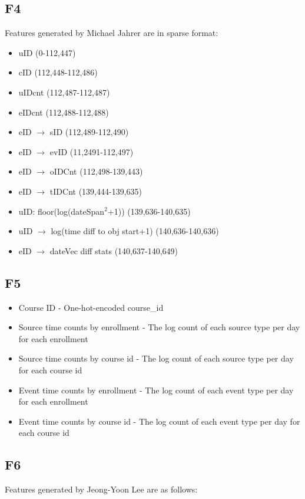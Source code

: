 \subsection{F4}
Features generated by Michael Jahrer are in sparse format:

\begin{itemize}
  \setlength\itemsep{0em}
  \item uID (0-112,447)
  \item cID (112,448-112,486)
  \item uIDcnt (112,487-112,487)
  \item eIDcnt (112,488-112,488)
  \item eID $\rightarrow$ sID (112,489-112,490)
  \item eID $\rightarrow$ evID (11,2491-112,497)
  \item eID $\rightarrow$ oIDCnt (112,498-139,443)
  \item eID $\rightarrow$ tIDCnt (139,444-139,635)
  \item uID: floor(log(dateSpan$^2$+1)) (139,636-140,635)
  \item uID $\rightarrow$ log(time diff to obj start+1) (140,636-140,636)
  \item eID $\rightarrow$ dateVec diff stats (140,637-140,649)
\end{itemize}

\subsection{F5}
\begin{itemize}
  \setlength\itemsep{0em}
  \item Course ID - One-hot-encoded course\_id
  \item Source time counts  by enrollment - The log count of each source type per day for each enrollment
  \item Source time counts by course id - The log count of each source type per day for each course id
  \item Event time counts by enrollment - The log count of each event type per day for each enrollment
  \item Event time counts by course id - The log count of each event type per day for each course id

\end{itemize}

\subsection{F6}
Features generated by Jeong-Yoon Lee are as follows:

